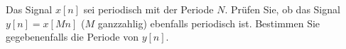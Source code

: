 \begin{uebsp}
\begin{Exercise}
Das Signal $x[n]$ sei periodisch mit der Periode $N$. Prüfen Sie, ob das Signal $y[n] = x[M n]$
($M$ ganzzahlig) ebenfalls periodisch ist. Bestimmen Sie gegebenenfalls die Periode von $y[n]$.
\end{Exercise}
\begin{Answer}
\end{Answer}
\end{uebsp}
